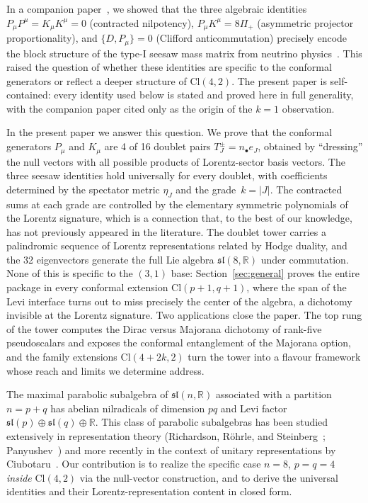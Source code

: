 \documentclass{birkjour}
\theoremstyle{definition}
\theoremstyle{remark}
\numberwithin{equation}{section}
\newcommand{\Cl}{\mathrm{Cl}}
\newcommand{\slR}{\mathfrak{sl}}
\newcommand{\glR}{\mathfrak{gl}}
\newcommand{\R}{\mathbb{R}}
\providecommand{\rev}{{}}
\begin{document}
In a companion paper~\cite{Hansen2026seesaw}, we showed
that the three algebraic identities
$P_\mu P^\mu=K_\mu K^\mu=0$ (contracted nilpotency),
$P_\mu K^\mu=8\Pi_+$ (asymmetric projector proportionality),
and $\{D,P_\mu\}=0$ (Clifford anticommutation)
precisely encode the block structure of the type-I seesaw
mass matrix from neutrino
physics~\cite{Minkowski1977,Yanagida1979,GellMann1979,Mohapatra1980}.
This raised the question of whether these identities are
specific to the conformal generators or reflect a deeper
structure of $\Cl(4,2)$.
\rev{The present paper is self-contained: every identity
used below is stated and proved here in full generality,
with the companion paper cited only as the origin of the
$k=1$ observation.}

In the present paper we answer this question.
We prove that the conformal generators $P_\mu$ and $K_\mu$ are
4 of 16 doublet pairs $T^\pm_J=n_\bullet e_J$, obtained
by ``dressing'' the null vectors with all possible products of
Lorentz-sector basis vectors.
The three seesaw identities hold universally for every doublet,
with coefficients determined by the spectator metric $\eta_J$
and the grade~$k=|J|$.
The contracted sums at each grade are controlled by the
elementary symmetric polynomials of the Lorentz signature, which is a
connection that, to the best of our knowledge, has not
previously appeared in the literature.
The doublet tower carries a palindromic sequence of Lorentz
representations related by Hodge duality, and the 32
eigenvectors generate the full Lie algebra $\slR(8,\R)$ under
commutation.
\rev{None of this is specific to the $(3,1)$ base:
Section~\ref{sec:general} proves the entire package in
every conformal extension $\Cl(p+1,q+1)$, where the span of
the Levi interface turns out to miss precisely the center
of the algebra, a dichotomy invisible at the Lorentz
signature. Two applications close the paper. The top rung
of the tower computes the Dirac versus Majorana dichotomy
of rank-five pseudoscalars and exposes the conformal
entanglement of the Majorana option, and the family
extensions $\Cl(4+2k,2)$ turn the tower into a flavour
framework whose reach and limits we determine address.}

The maximal parabolic subalgebra of $\slR(n,\R)$ associated
with a partition $n=p+q$ has abelian nilradicals of dimension
$pq$ and Levi factor
$\slR(p)\oplus\slR(q)\oplus\R$.
This class of parabolic subalgebras has been studied
extensively in representation theory (Richardson, R\"ohrle,
and Steinberg~\cite{Richardson1992}; Panyushev~\cite{Panyushev1999})
and more recently in the context of unitary representations
by Ciubotaru~\cite{Ciubotaru2025}.
Our contribution is to realize the specific case $n=8$,
$p=q=4$ \emph{inside} $\Cl(4,2)$ via the null-vector
construction, and to derive the universal identities and
their Lorentz-representation content in closed form.
\end{document}

